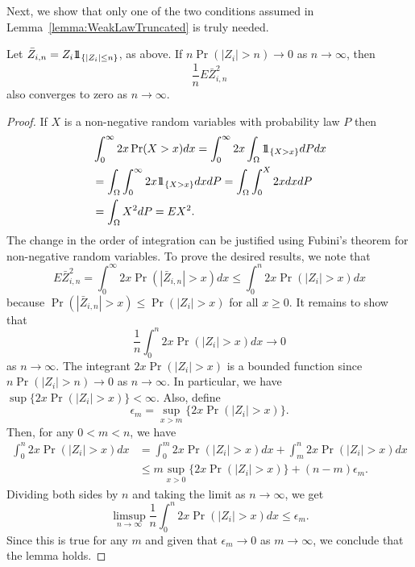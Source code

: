 Next, we show that only one of the two conditions assumed in Lemma~\ref{lemma:WeakLawTruncated} is truly needed.

\begin{lemma} \label{lemma:NormalizedTruncatedConvergence}
Let $\bar{Z}_{i,n} = Z_i \mathrm{1\!\!1}_{\{ |Z_i| \leq n \}}$, as above.
If $n \Pr (|Z_i| > n) \rightarrow 0$ as $n \rightarrow \infty$, then
\begin{equation*}
\frac{1}{n} E \bar{Z}_{i,n}^2
\end{equation*}
also converges to zero as $n \rightarrow \infty$.
\end{lemma}
\begin{proof}
If $X$ is a non-negative random variables with probability law $P$ then
\begin{equation*}
\begin{split}
&\int_0^{\infty} 2 x \Pr (X > x) dx
= \int_0^{\infty} 2 x \int_{\Omega} \mathrm{1\!\!1}_{\{ X > x \}} dP dx \\
&= \int_{\Omega} \int_0^{\infty} 2 x \mathrm{1\!\!1}_{\{ X > x \}} dx dP
= \int_{\Omega} \int_0^{X} 2 x dx dP \\
&= \int_{\Omega} X^2 dP = E X^2 .
\end{split}
\end{equation*}
The change in the order of integration can be justified using Fubini's theorem for non-negative random variables.
To prove the desired results, we note that
\begin{equation*}
E \bar{Z}_{i,n}^2
= \int_0^{\infty} 2 x \Pr \left( |\bar{Z}_{i,n}| > x \right) dx
\leq \int_0^n 2 x \Pr ( |Z_i| > x ) dx
\end{equation*}
because $\Pr \left( |\bar{Z}_{i,n}| > x \right) \leq \Pr (|Z_i| > x)$ for all $x \geq 0$.
It remains to show that
\begin{equation*}
\frac{1}{n} \int_0^n 2 x \Pr ( |Z_i| > x ) dx \rightarrow 0
\end{equation*}
as $n \rightarrow \infty$.
The integrant $2 x \Pr(|Z_i| > x)$ is a bounded function since $n \Pr (|Z_i| > n) \rightarrow 0$ as $n \rightarrow \infty$.
In particular, we have $\sup \{ 2 x \Pr(|Z_i| > x) \} < \infty$.
Also, define
\begin{equation*}
\epsilon_m = \sup_{x > m} \{ 2 x \Pr(|Z_i| > x) \} .
\end{equation*}
Then, for any $0 < m < n$, we have
\begin{equation*}
\begin{split}
\int_0^n 2 x \Pr ( |Z_i| > x ) dx
&= \int_0^m 2 x \Pr ( |Z_i| > x ) dx + \int_m^n 2 x \Pr ( |Z_i| > x ) dx \\
&\leq m \sup_{x > 0} \{ 2 x \Pr(|Z_i| > x) \} + (n - m) \epsilon_m .
\end{split}
\end{equation*}
Dividing both sides by $n$ and taking the limit as $n \rightarrow \infty$, we get
\begin{equation*}
\limsup_{n \rightarrow \infty} \frac{1}{n} \int_0^n 2 x \Pr ( |Z_i| > x ) dx
\leq \epsilon_m .
\end{equation*}
Since this is true for any $m$ and given that $\epsilon_m \rightarrow 0$ as $m \rightarrow \infty$, we conclude that the lemma holds.
\end{proof}

